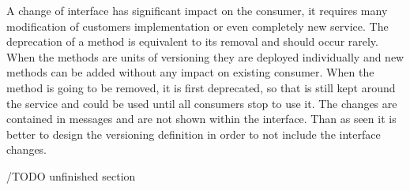 
A change of interface has significant impact on the consumer, it requires many modification of customers implementation or even completely new service. The deprecation of a method is equivalent to its removal and should occur rarely.
When the methods are units of versioning they are deployed individually and new methods can be added without any impact on existing consumer. When the method is going to be removed, it is first deprecated, so that is still kept around the service and could be used until all consumers stop to use it. The changes are contained in messages and are not shown within the interface.
Than as seen it is better to design the versioning definition in order to not include the interface changes.

/TODO unfinished section





